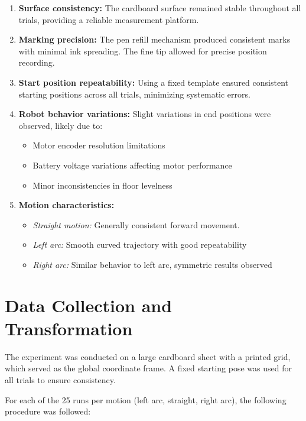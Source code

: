 \begin{enumerate}
    \item \textbf{Surface consistency:} The cardboard surface remained stable throughout all trials, providing a reliable measurement platform.
    
    \item \textbf{Marking precision:} The pen refill mechanism produced consistent marks with minimal ink spreading. The fine tip allowed for precise position recording.
    
    \item \textbf{Start position repeatability:} Using a fixed template ensured consistent starting positions across all trials, minimizing systematic errors.
    
    \item \textbf{Robot behavior variations:} Slight variations in end positions were observed, likely due to:
    \begin{itemize}
        \item Motor encoder resolution limitations
        \item Battery voltage variations affecting motor performance
        \item Minor inconsistencies in floor levelness
    \end{itemize}


    \item \textbf{Motion characteristics:}
    \begin{itemize}
        \item \textit{Straight motion:} Generally consistent forward movement.
        \item \textit{Left arc:} Smooth curved trajectory with good repeatability
        \item \textit{Right arc:} Similar behavior to left arc, symmetric results observed
    \end{itemize}
\end{enumerate}

\section{Data Collection and Transformation}

The experiment was conducted on a large cardboard sheet with a printed grid, which served as the global coordinate frame. A fixed starting pose was used for all trials to ensure consistency.

For each of the 25 runs per motion (left arc, straight, right arc), the following procedure was followed:

